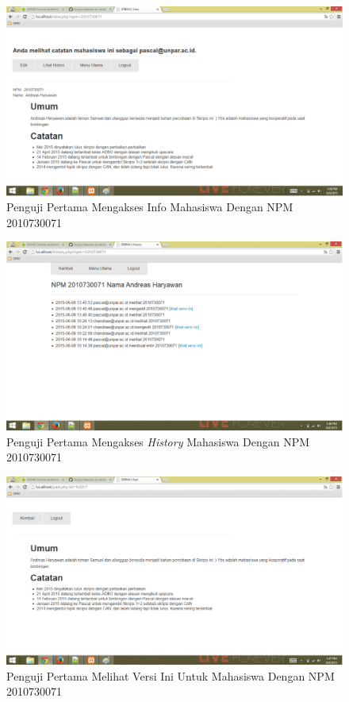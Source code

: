 \begin{figure}[p]
\centering
\includegraphics[scale=0.44]{Gambar/eks9.png}
\caption[Penguji Pertama Mengakses Info Mahasiswa Dengan NPM 2010730071]{Penguji Pertama Mengakses Info Mahasiswa Dengan NPM 2010730071} 
\label{fig:eks9}
\end{figure}

\begin{figure}[p]
\centering
\includegraphics[scale=0.44]{Gambar/eks10.png}
\caption[Penguji Pertama Mengakses {\it History} Mahasiswa Dengan NPM 2010730071]{Penguji Pertama Mengakses {\it History} Mahasiswa Dengan NPM 2010730071} 
\label{fig:eks10}
\end{figure}

\begin{figure}[p]
\centering
\includegraphics[scale=0.44]{Gambar/eks11.png}
\caption[Penguji Pertama Melihat Versi Ini Untuk Mahasiswa Dengan NPM 2010730071]{Penguji Pertama Melihat Versi Ini Untuk Mahasiswa Dengan NPM 2010730071} 
\label{fig:eks11}
\end{figure}

